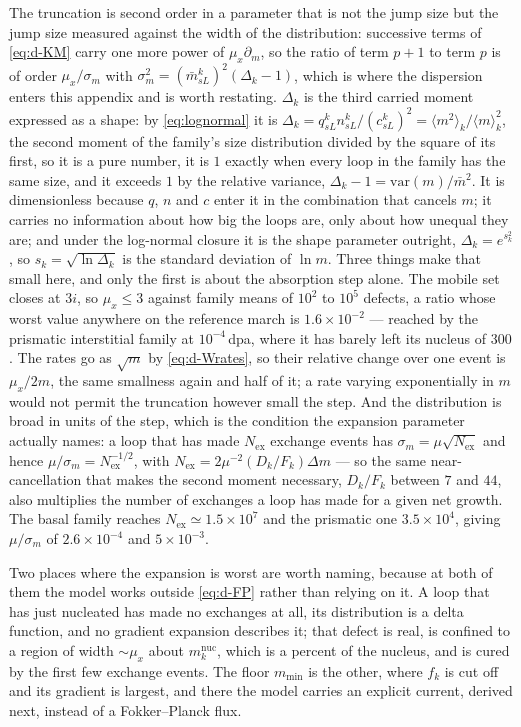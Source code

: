 The truncation is second order in a parameter that is not the jump size but the
jump size measured against the width of the distribution: successive terms of
\cref{eq:d-KM} carry one more power of $\mu_x\partial_m$, so the ratio of term
$p+1$ to term $p$ is of order $\mu_x/\sigma_m$ with
$\sigma_m^{2}=(\bar m^k_{sL})^{2}(\Delta_k-1)$, which is where the dispersion
enters this appendix and is worth restating. $\Delta_k$ is the third carried
moment expressed as a shape: by \cref{eq:lognormal} it is
$\Delta_k=q^k_{sL}n^k_{sL}/(c^k_{sL})^{2}=\langle m^{2}\rangle_k/\langle
m\rangle_k^{2}$, the second moment of the family's size distribution divided by
the square of its first, so it is a pure number, it is $1$ exactly when every
loop in the family has the same size, and it exceeds $1$ by the relative
variance, $\Delta_k-1=\mathrm{var}(m)/\bar m^{2}$. It is dimensionless because
$q$, $n$ and $c$ enter it in the combination that cancels $m$; it carries no
information about how big the loops are, only about how unequal they are; and
under the log-normal closure it is the shape parameter outright,
$\Delta_k=e^{s_k^{2}}$, so $s_k=\sqrt{\ln\Delta_k}$ is the standard
deviation of $\ln m$. Three things make that small
here, and only the first is about the absorption step alone. The mobile set
closes at $3i$, so $\mu_x\le3$ against family means of $10^{2}$ to $10^{5}$
defects, a ratio whose worst value anywhere on the reference march is
$1.6\times10^{-2}$ --- reached by the prismatic interstitial family at
$10^{-4}\,$dpa, where it has barely left its nucleus of $300$. The rates go as
$\sqrt m$ by \cref{eq:d-Wrates}, so their relative change over one event is
$\mu_x/2m$, the same smallness again and half of it; a rate varying
exponentially in $m$ would not permit the truncation however small the step. And
the distribution is broad in units of the step, which is the condition the
expansion parameter actually names: a loop that has made $N_{\mathrm{ex}}$
exchange events has $\sigma_m=\mu\sqrt{N_{\mathrm{ex}}}$ and hence
$\mu/\sigma_m=N_{\mathrm{ex}}^{-1/2}$, with
$N_{\mathrm{ex}}=2\mu^{-2}(D_k/F_k)\Delta m$ --- so the same near-cancellation
that makes the second moment necessary, $D_k/F_k$ between $7$ and $44$, also
multiplies the number of exchanges a loop has made for a given net growth. The
basal family reaches $N_{\mathrm{ex}}\simeq1.5\times10^{7}$ and the prismatic one
$3.5\times10^{4}$, giving $\mu/\sigma_m$ of $2.6\times10^{-4}$ and
$5\times10^{-3}$.

Two places where the expansion is worst are worth naming, because at both of
them the model works outside \cref{eq:d-FP} rather than relying on it. A loop
that has just nucleated has made no exchanges at all, its distribution is a delta
function, and no gradient expansion describes it; that defect is real, is
confined to a region of width $\sim\mu_x$ about $m^{\mathrm{nuc}}_k$, which is a
percent of the nucleus, and is cured by the first few exchange events. The floor
$m_{\min}$ is the other, where $f_k$ is cut off and its gradient is largest, and
there the model carries an explicit current, derived next, instead of a
Fokker--Planck flux.

